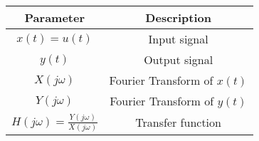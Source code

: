 \begin{tabular}{|c|c|}
\hline
    \textbf{Parameter} & \textbf{Description} \\
    \hline
    $x(t) = u(t)$ & Input signal \\
    \hline
    $y(t)$ & Output signal\\
    \hline
    $X(j\omega)$ & Fourier Transform of $x(t)$\\
    \hline
    $Y(j\omega)$ & Fourier Transform of $y(t)$\\
    \hline
    $H(j\omega) = \frac{Y(j\omega)}{X(j\omega)}$ & Transfer function \\
    \hline
\end{tabular}
